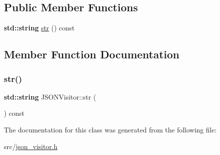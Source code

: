 \subsection*{Public Member Functions}
\begin{DoxyCompactItemize}
\item 
\textbf{ std\+::string} \hyperlink{class_j_s_o_n_visitor_a35147fa8b2cc5c939fa86e6b177aa58a}{str} () const
\end{DoxyCompactItemize}


\subsection{Member Function Documentation}
\mbox{\label{class_j_s_o_n_visitor_a35147fa8b2cc5c939fa86e6b177aa58a}} 
\subsubsection{\texorpdfstring{str()}{str()}}
{\footnotesize\ttfamily \textbf{ std\+::string} J\+S\+O\+N\+Visitor\+::str (\begin{DoxyParamCaption}{ }\end{DoxyParamCaption}) const\hspace{0.3cm}{\ttfamily [inline]}}



The documentation for this class was generated from the following file\+:\begin{DoxyCompactItemize}
\item 
src/\hyperlink{json__visitor_8h}{json\+\_\+visitor.\+h}\end{DoxyCompactItemize}
